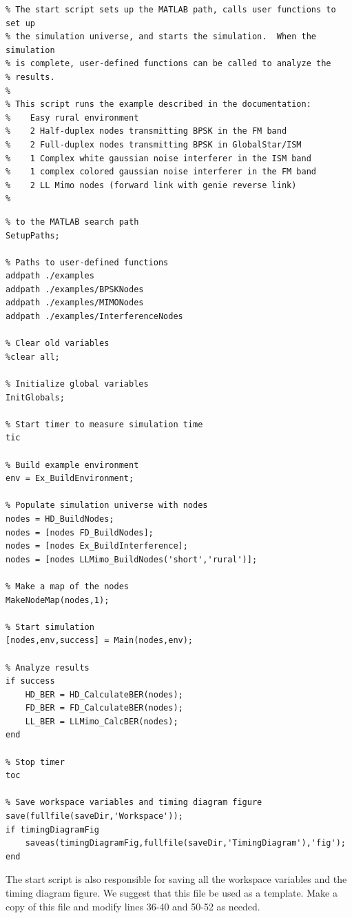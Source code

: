 \begin{lstlisting}[name=startExample]
% Script StartExample.m:
% The start script sets up the MATLAB path, calls user functions to set up
% the simulation universe, and starts the simulation.  When the simulation
% is complete, user-defined functions can be called to analyze the
% results.
%
% This script runs the example described in the documentation:
%    Easy rural environment
%    2 Half-duplex nodes transmitting BPSK in the FM band
%    2 Full-duplex nodes transmitting BPSK in GlobalStar/ISM
%    1 Complex white gaussian noise interferer in the ISM band
%    1 complex colored gaussian noise interferer in the FM band
%    2 LL Mimo nodes (forward link with genie reverse link)
%
\end{lstlisting}
\begin{lstlisting}[name=startExample,firstnumber=21]
% Add required directories containing simulator functions 
% to the MATLAB search path
SetupPaths;

% Paths to user-defined functions
addpath ./examples
addpath ./examples/BPSKNodes
addpath ./examples/MIMONodes
addpath ./examples/InterferenceNodes

% Clear old variables
%clear all;

% Initialize global variables
InitGlobals;

% Start timer to measure simulation time
tic

% Build example environment
env = Ex_BuildEnvironment;

% Populate simulation universe with nodes
nodes = HD_BuildNodes;
nodes = [nodes FD_BuildNodes];
nodes = [nodes Ex_BuildInterference];
nodes = [nodes LLMimo_BuildNodes('short','rural')];

% Make a map of the nodes
MakeNodeMap(nodes,1);

% Start simulation
[nodes,env,success] = Main(nodes,env);

% Analyze results
if success
    HD_BER = HD_CalculateBER(nodes);
    FD_BER = FD_CalculateBER(nodes);
    LL_BER = LLMimo_CalcBER(nodes);
end

% Stop timer
toc

% Save workspace variables and timing diagram figure
save(fullfile(saveDir,'Workspace'));
if timingDiagramFig
    saveas(timingDiagramFig,fullfile(saveDir,'TimingDiagram'),'fig');
end
\end{lstlisting}

The start script is also responsible for saving all the workspace
variables and the timing diagram figure.  We suggest that this file
be used as a template.  Make a copy of this file and modify lines
36-40 and 50-52 as needed.

